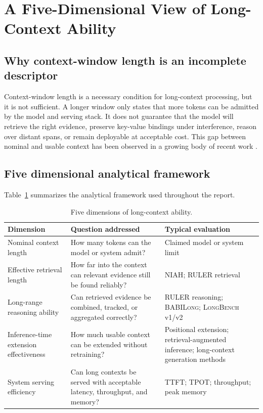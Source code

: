 \documentclass{article}
\begin{document}
\section{A Five-Dimensional View of Long-Context Ability}
\label{sec:framework}

\subsection{Why context-window length is an incomplete descriptor}
Context-window length is a necessary condition for long-context processing, but it is not sufficient. A longer window only states that more tokens can be admitted by the model and serving stack. It does not guarantee that the model will retrieve the right evidence, preserve key-value bindings under interference, reason over distant spans, or remain deployable at acceptable cost. This gap between nominal and usable context has been observed in a growing body of recent work \citep{liu2024lost, hsieh2024ruler, bai2025longbenchv2}.

\subsection{Five dimensional analytical framework}
Table~\ref{tab:framework} summarizes the analytical framework used throughout the report.

\begin{table}[t]
\centering
\begin{tabularx}{\textwidth}{
    >{\raggedright\arraybackslash}p{}
    >{\raggedright\arraybackslash}X
    >{\raggedright\arraybackslash}p{}
}
\toprule
\textbf{Dimension}
& \textbf{Question addressed}
& \textbf{Typical evaluation} \\
\midrule
Nominal context length
& How many tokens can the model or system admit?
& Claimed model or system limit \\

Effective retrieval length
& How far into the context can relevant evidence still be found reliably?
& \textsc{NIAH}; \textsc{RULER} retrieval \\

Long-range reasoning ability
& Can retrieved evidence be combined, tracked, or aggregated correctly?
& \textsc{RULER} reasoning; \textsc{BABILong}; \textsc{LongBench} v1/v2 \\

Inference-time extension effectiveness
& How much usable context can be extended without retraining?
& Positional extension; retrieval-augmented inference; long-context generation methods \\

System serving efficiency
& Can long contexts be served with acceptable latency, throughput, and memory?
& TTFT; TPOT; throughput; peak memory \\
\bottomrule
\end{tabularx}
\caption{Five dimensions of long-context ability.}
\label{tab:framework}
\end{table}
\end{document}

